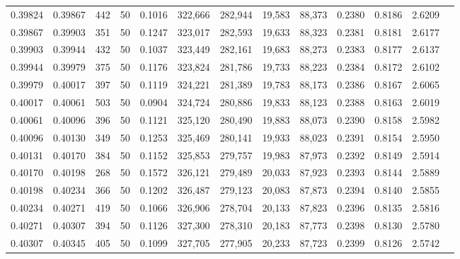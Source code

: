 \begin{tabular}{rrrrrrrrrrrrr}
0.39824 & 0.39867 &   442 &  50 &                                     0.1016 & 322,666 & 282,944 &  19,583 &  88,373 & 0.2380 & 0.8186 & 2.6209 \\
0.39867 & 0.39903 &   351 &  50 &                                     0.1247 & 323,017 & 282,593 &  19,633 &  88,323 & 0.2381 & 0.8181 & 2.6177 \\
0.39903 & 0.39944 &   432 &  50 &                                     0.1037 & 323,449 & 282,161 &  19,683 &  88,273 & 0.2383 & 0.8177 & 2.6137 \\
0.39944 & 0.39979 &   375 &  50 &                                     0.1176 & 323,824 & 281,786 &  19,733 &  88,223 & 0.2384 & 0.8172 & 2.6102 \\
0.39979 & 0.40017 &   397 &  50 &                                     0.1119 & 324,221 & 281,389 &  19,783 &  88,173 & 0.2386 & 0.8167 & 2.6065 \\
0.40017 & 0.40061 &   503 &  50 &                                     0.0904 & 324,724 & 280,886 &  19,833 &  88,123 & 0.2388 & 0.8163 & 2.6019 \\
0.40061 & 0.40096 &   396 &  50 &                                     0.1121 & 325,120 & 280,490 &  19,883 &  88,073 & 0.2390 & 0.8158 & 2.5982 \\
0.40096 & 0.40130 &   349 &  50 &                                     0.1253 & 325,469 & 280,141 &  19,933 &  88,023 & 0.2391 & 0.8154 & 2.5950 \\
0.40131 & 0.40170 &   384 &  50 &                                     0.1152 & 325,853 & 279,757 &  19,983 &  87,973 & 0.2392 & 0.8149 & 2.5914 \\
0.40170 & 0.40198 &   268 &  50 &                                     0.1572 & 326,121 & 279,489 &  20,033 &  87,923 & 0.2393 & 0.8144 & 2.5889 \\
0.40198 & 0.40234 &   366 &  50 &                                     0.1202 & 326,487 & 279,123 &  20,083 &  87,873 & 0.2394 & 0.8140 & 2.5855 \\
0.40234 & 0.40271 &   419 &  50 &                                     0.1066 & 326,906 & 278,704 &  20,133 &  87,823 & 0.2396 & 0.8135 & 2.5816 \\
0.40271 & 0.40307 &   394 &  50 &                                     0.1126 & 327,300 & 278,310 &  20,183 &  87,773 & 0.2398 & 0.8130 & 2.5780 \\
0.40307 & 0.40345 &   405 &  50 &                                     0.1099 & 327,705 & 277,905 &  20,233 &  87,723 & 0.2399 & 0.8126 & 2.5742 \\

\end{tabular}
